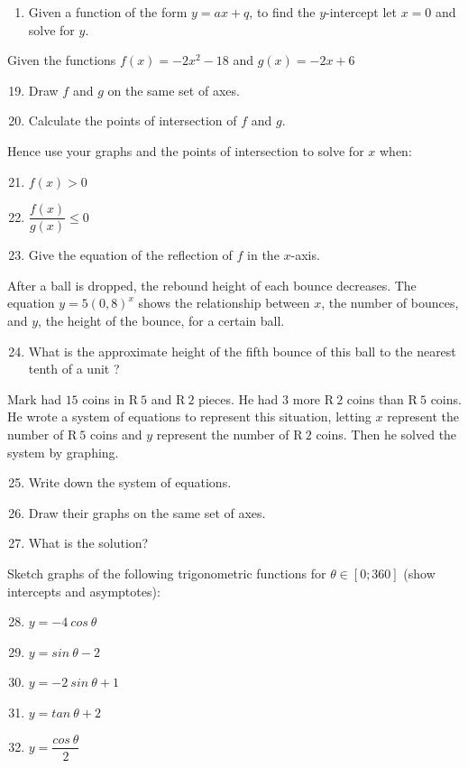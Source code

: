 \begin{eocexercises}{}
\begin{enumerate}[noitemsep, label=\textbf{\arabic*}. ]
    \item Given a function of the form $y=ax+q$, to find the $y$-intercept let $x=0$ and solve for $y$.
    \end{enumerate}
Given the functions $f(x)=-2{x}^{2}-18$ and $g(x)=-2x+6$
    \begin{enumerate}[noitemsep, label=\textbf{\arabic*}. ] 
\setcounter{enumi}{18} 
    \item Draw $f$ and $g$ on the same set of axes.
    \item Calculate the points of intersection of $f$ and $g$.
\end{enumerate}
Hence use your graphs and the points of intersection to solve for $x$ when:
	\begin{enumerate}[itemsep=3pt, label=\textbf{\arabic*}. ] 
\setcounter{enumi}{20} 
	\item $f(x)>0$
	\item $\dfrac{f(x)}{g(x)}\le 0$
\item Give the equation of the reflection of $f$ in the $x$-axis.
\end{enumerate}
	After a ball is dropped, the rebound height of each bounce decreases. The equation $y=5{(0,8)}^{x}$ shows the relationship between $x$, the number of bounces, and $y$, the height of the bounce, for a certain ball. 
\begin{enumerate}[noitemsep, label=\textbf{\arabic*}. ] 
\setcounter{enumi}{23} 
 
\item 
What is the approximate height of the fifth bounce of this ball to the nearest tenth of a unit ?
\end{enumerate}

Mark had $15$ coins in R$~5$ and R$~2$ pieces. He had $3$ more R$~2$ coins than R$~5$ coins. He wrote a system of equations to represent this situation, letting $x$ represent the number of R$~5$ coins and $y$ represent the number of R$~2$ coins. Then he solved the system by graphing.
	\begin{enumerate}[noitemsep, label=\textbf{\arabic*}. ] 
\setcounter{enumi}{24} 
    \item Write down the system of equations.
    \item Draw their graphs on the same set of axes.
    \item What is the solution?
    \end{enumerate}
Sketch graphs of the following trigonometric functions for $\theta \in[0;360]$ (show intercepts and asymptotes):
	\begin{enumerate}[noitemsep, label=\textbf{\arabic*}. ] 
\setcounter{enumi}{27} 
    \item $y=-4~cos~\theta$
    \item $y=sin~\theta -2$
\item $y=-2~sin~\theta +1$
\item $y=tan~\theta+2$
\item $y=\dfrac{cos~\theta}{2}$
    \end{enumerate}



\end{eocexercises}
